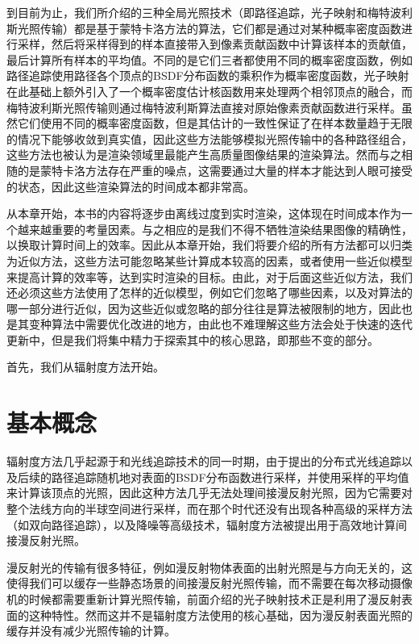 到目前为止，我们所介绍的三种全局光照技术（即路径追踪，光子映射和梅特波利斯光照传输）都是基于蒙特卡洛方法的算法，它们都是通过对某种概率密度函数进行采样，然后将采样得到的样本直接带入到像素贡献函数中计算该样本的贡献值，最后计算所有样本的平均值。不同的是它们三者都使用不同的概率密度函数，例如路径追踪使用路径各个顶点的BSDF分布函数的乘积作为概率密度函数，光子映射在此基础上额外引入了一个概率密度估计核函数用来处理两个相邻顶点的融合，而梅特波利斯光照传输则通过梅特波利斯算法直接对原始像素贡献函数进行采样。虽然它们使用不同的概率密度函数，但是其估计的一致性保证了在样本数量趋于无限的情况下能够收敛到真实值，因此这些方法能够模拟光照传输中的各种路径组合，这些方法也被认为是渲染领域里最能产生高质量图像结果的渲染算法。然而与之相随的是蒙特卡洛方法存在严重的噪点，这需要通过大量的样本才能达到人眼可接受的状态，因此这些渲染算法的时间成本都非常高。

从本章开始，本书的内容将逐步由离线过度到实时渲染，这体现在时间成本作为一个越来越重要的考量因素。与之相应的是我们不得不牺牲渲染结果图像的精确性，以换取计算时间上的效率。因此从本章开始，我们将要介绍的所有方法都可以归类为近似方法，这些方法可能忽略某些计算成本较高的因素，或者使用一些近似模型来提高计算的效率等，达到实时渲染的目标。由此，对于后面这些近似方法，我们还必须这些方法使用了怎样的近似模型，例如它们忽略了哪些因素，以及对算法的哪一部分进行近似，因为这些近似或忽略的部分往往是算法被限制的地方，因此也是其变种算法中需要优化改进的地方，由此也不难理解这些方法会处于快速的迭代更新中，但是我们将集中精力于探索其中的核心思路，即那些不变的部分。

首先，我们从辐射度方法开始。





\section{基本概念}
辐射度方法几乎起源于和光线追踪技术的同一时期，由于\cite{a:DistributedRayTracing}提出的分布式光线追踪以及后续的路径追踪随机地对表面的BSDF分布函数进行采样，并使用采样的平均值来计算该顶点的光照，因此这种方法几乎无法处理间接漫反射光照，因为它需要对整个法线方向的半球空间进行采样，而在那个时代还没有出现各种高级的采样方法（如双向路径追踪），以及降噪等高级技术，辐射度方法\cite{a:ModelingtheInteractionofLightBetweenDiffuseSurfaces}被提出用于高效地计算间接漫反射光照。

漫反射光的传输有很多特征，例如漫反射物体表面的出射光照是与方向无关的，这使得我们可以缓存一些静态场景的间接漫反射光照传输，而不需要在每次移动摄像机的时候都需要重新计算光照传输，前面介绍的光子映射技术正是利用了漫反射表面的这种特性。然而这并不是辐射度方法使用的核心基础，因为漫反射表面光照的缓存并没有减少光照传输的计算。


